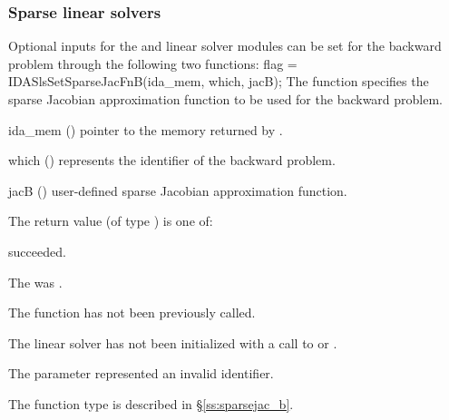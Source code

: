 \subsubsection{Sparse linear solvers}
Optional inputs for the {\idaklu} and {\idasuperlumt} linear solver
modules can be set for the backward problem through the following two
functions: 
{
  flag = IDASlsSetSparseJacFnB(ida\_mem, which, jacB);
}
{
  The function  specifies the sparse Jacobian
  approximation function to be used for the backward problem.
}
{
  \begin{args}
  \item[ida\_mem] ()
    pointer to the {\idas} memory returned by .
  \item[which] ()
    represents the identifier of the backward problem.
  \item[jacB] ()
    user-defined sparse Jacobian approximation function.
  \end{args}
}
{
  The return value  (of type ) is one of:
  \begin{args}
  \item[\Id{IDASLS\_SUCCESS}] 
     succeeded.
  \item[\Id{IDASLS\_MEM\_NULL}]
    The  was .
  \item[\Id{IDASLS\_NO\_ADJ}]
    The function  has not been previously called.
  \item[\Id{IDASLS\_LMEM\_NULL}]
    The linear solver has not been initialized with a call to 
    or .
  \item[\Id{IDASLS\_ILL\_INPUT}]
    The parameter  represented an invalid identifier.
  \end{args}
}
{
  The function type  is described in \S\ref{ss:sparsejac_b}.
}


